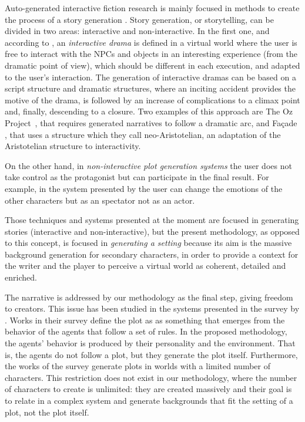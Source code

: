 \documentclass[letterpaper]{article}
\begin{document}
Auto-generated interactive fiction research is mainly focused in
methods to create the process of a story generation
\citep{nairat2011character}. Story generation, or storytelling, can be divided in two areas: interactive and non-interactive. In the first one, and
according to \citep{ReviewArinbjarnar09}, an {\em interactive drama} is
defined in a virtual world where the user is free to interact with
the NPCs and objects in an interesting experience (from the dramatic point of view), which should be different in each execution, and adapted to the user's interaction. The generation of interactive dramas can be based on a script
structure \citep{ArchitectureYoung04} and dramatic structures, where an inciting accident provides the motive of the drama, is followed by an increase of complications to a climax point and, finally, descending to a closure. Two examples of this approach are The Oz Project~\citep{ozproject}, that requires generated narratives to follow a dramatic arc, and Fa\c{c}ade \citep{facade}, that uses a structure
which they call neo-Aristotelian, an adaptation of the Aristotelian
structure to interactivity.


On the other hand, in {\em non-interactive plot generation systems} the user
does not take control as the protagonist but can participate in the final result. For example, in the system
presented by  \cite{pizzi2007interactive} the user can change the emotions of the other characters but as an spectator not as an actor.

Those techniques and systems presented at the moment are focused in generating stories (interactive and non-interactive), but the present methodology, as opposed to this concept, is focused in \textit{generating a setting}
because its aim is the massive background generation
for secondary characters, in order to provide a context for the writer and the
player to perceive a virtual world as coherent, detailed and
enriched.

The narrative is addressed by our methodology as the final step, giving freedom to creators. This issue has been studied in the systems presented in
the survey by \cite{ReviewArinbjarnar09}. Works in their survey define the plot as as something that emerges from the behavior of the agents that follow a set of rules. In the proposed methodology, the agents' behavior is produced by their personality and the environment. That is, the agents do not follow a plot, but they generate the plot itself. Furthermore, the works of the survey generate plots in worlds with a limited number of characters. This restriction does not exist in our methodology, where the number of characters to create is unlimited: they are created massively and their goal is to relate in a complex system and generate backgrounds that fit the setting of a plot, not the plot itself.
\end{document}
